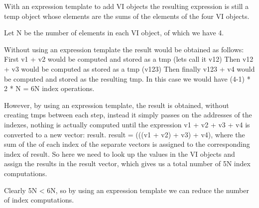 With an expression template to add VI objects the resulting expression is still a temp object whose elements are the sums of the elements of the four VI objects.

Let N be the number of elements in each VI object, of which we have 4.

Without using an expression template the result would be obtained as follows:
First v1 + v2 would be computed and stored as a tmp (lets call it v12)
Then v12 + v3 would be computed as stored as a tmp (v123)
Then finally v123 + v4 would be computed and stored as the resulting tmp.
In this case we would have (4-1) * 2 * N = 6N index operations.

However, by using an expression template, the result is obtained, without creating tmps between each step, instead it simply passes on the  addresses of the indexes, nothing is actually computed until the expression v1 + v2 + v3 + v4 is converted to a new vector: result.
result = (((v1 + v2)  + v3) + v4), where the sum of the of each index of the separate vectors is assigned to the corresponding index of result.
So here we need to look up the values in the VI objects and assign the results in the result vector, which gives us a total number of 5N index computations.

Clearly 5N < 6N, so by using an expression template we can reduce the number of index computations.
